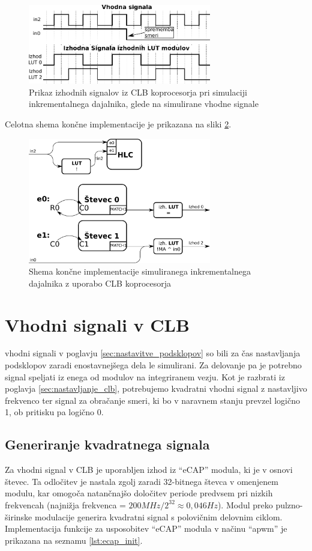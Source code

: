 \documentclass[a4paper]{article}
\begin{document}
\begin{sloppypar}
\begin{figure}[htb]
    \centerline{\includegraphics[width=8cm]{obracanje_smeri_potek}}
    \caption{Prikaz izhodnih signalov iz CLB koprocesorja pri simulaciji 
             inkrementalnega dajalnika, glede na simulirane vhodne signale}
    \label{fig:obracanje_smeri}
\end{figure}

Celotna shema končne implementacije je prikazana na sliki
\ref{fig:koncna_shema}.

\begin{figure}[htb]
    \centerline{\includegraphics[width=8cm]{koncna_shema}}
    \caption{Shema končne implementacije simuliranega inkrementalnega
             dajalnika z uporabo CLB koprocesorja}
    \label{fig:koncna_shema}
\end{figure}


\section{Vhodni signali v CLB}
vhodni signali v poglavju \ref{sec:nastavitve_podsklopov} so bili za čas
nastavljanja podsklopov zaradi enostavnejšega dela le simulirani. Za delovanje
pa je potrebno signal speljati iz enega od modulov na integriranem vezju. Kot
je razbrati iz poglavja \ref{sec:nastavljanje_clb}, potrebujemo kvadratni
vhodni signal z nastavljivo frekvenco ter signal za obračanje smeri, ki bo v
naravnem stanju prevzel logično 1, ob pritisku pa logično 0.

\subsection{Generiranje kvadratnega signala}
Za vhodni signal v CLB je uporabljen izhod iz ``eCAP'' modula, ki je v osnovi
števec. Ta odločitev je nastala zgolj zaradi 32-bitnega števca v omenjenem
modulu, kar omogoča natančnajšo določitev periode predvsem pri nizkih
frekvencah (najnižja frekvenca = $200 MHz/2^{32} \approx 0,046 Hz$). Modul
preko pulzno-širinske modulacije generira kvadratni signal s polovičnim
delovnim ciklom. Implementacija funkcije za usposobitev ``eCAP'' modula v
načinu ``apwm'' je prikazana na seznamu \ref{lst:ecap_init}.


\end{sloppypar}
\end{document}

